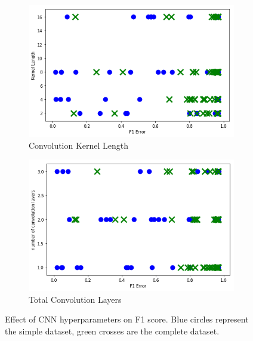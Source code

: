 \begin{figure}[H]
     \begin{subfigure}[b]{0.49\textwidth}
         \centering
         \includegraphics[width=\textwidth]{images/cnn_kernel_length_dummy.png}
         \caption{Convolution Kernel Length}
         \label{fig:cnn_L2_scale_learning}
     \end{subfigure}
     \hfill
     \begin{subfigure}[b]{0.49\textwidth}
         \centering
         \includegraphics[width=\textwidth]{images/cnn_num_conv_layers_dummy.png}
         \caption{Total Convolution Layers}
         \label{fig:cnn_total_nodes_learning}
     \end{subfigure}  
     
        \caption{Effect of CNN hyperparameters on F1 score. Blue circles represent the simple dataset, green crosses are the complete dataset.}
        \label{fig:cnn_hyperparameters_f1_score}
\end{figure}


